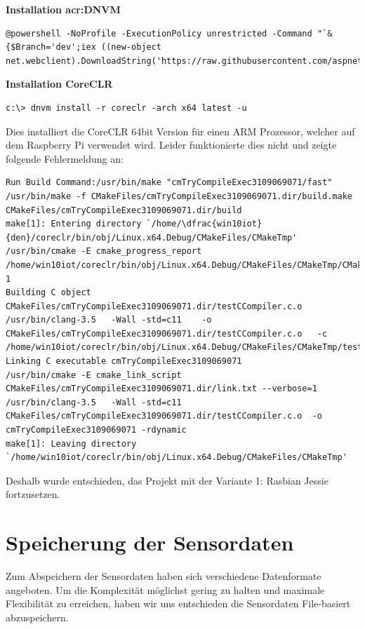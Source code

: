 \textbf{Installation \gls{acr:DNVM}} \\
\begin{lstlisting}
@powershell -NoProfile -ExecutionPolicy unrestricted -Command "`&{$Branch='dev';iex ((new-object net.webclient).DownloadString('https://raw.githubusercontent.com/aspnet/Home/dev/dnvminstall.ps1'))}"'
\end{lstlisting}

\textbf{Installation CoreCLR} \\
\begin{lstlisting}
c:\> dnvm install -r coreclr -arch x64 latest -u
\end{lstlisting}
Dies installiert die CoreCLR 64bit Version für einen ARM Prozessor, welcher auf dem Raspberry Pi verwendet wird. Leider funktionierte dies nicht und zeigte folgende Fehlermeldung an:

\begin{lstlisting}
Run Build Command:/usr/bin/make "cmTryCompileExec3109069071/fast"
/usr/bin/make -f CMakeFiles/cmTryCompileExec3109069071.dir/build.make CMakeFiles/cmTryCompileExec3109069071.dir/build
make[1]: Entering directory `/home/\dfrac{win10iot}{den}/coreclr/bin/obj/Linux.x64.Debug/CMakeFiles/CMakeTmp'
/usr/bin/cmake -E cmake_progress_report /home/win10iot/coreclr/bin/obj/Linux.x64.Debug/CMakeFiles/CMakeTmp/CMakeFiles 1
Building C object CMakeFiles/cmTryCompileExec3109069071.dir/testCCompiler.c.o
/usr/bin/clang-3.5   -Wall -std=c11    -o CMakeFiles/cmTryCompileExec3109069071.dir/testCCompiler.c.o   -c /home/win10iot/coreclr/bin/obj/Linux.x64.Debug/CMakeFiles/CMakeTmp/testCCompiler.c
Linking C executable cmTryCompileExec3109069071
/usr/bin/cmake -E cmake_link_script CMakeFiles/cmTryCompileExec3109069071.dir/link.txt --verbose=1
/usr/bin/clang-3.5   -Wall -std=c11     CMakeFiles/cmTryCompileExec3109069071.dir/testCCompiler.c.o  -o cmTryCompileExec3109069071 -rdynamic 
make[1]: Leaving directory `/home/win10iot/coreclr/bin/obj/Linux.x64.Debug/CMakeFiles/CMakeTmp'
\end{lstlisting}

Deshalb wurde entschieden, das Projekt mit der Variante 1: Rasbian Jessie fortzusetzen.

\section{Speicherung der Sensordaten}
Zum Abspeichern der Sensordaten haben sich verschiedene Datenformate angeboten. Um die Komplexität möglichst gering zu halten und maximale Flexibilität zu erreichen, haben wir uns entschieden die Sensordaten File-basiert abzuspeichern.


